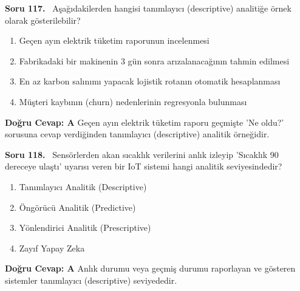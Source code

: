 \documentclass[11pt,a4paper,openany]{book}
\begin{document}
\needspace{5cm}
\vspace{8pt}
\noindent\textbf{\large\sffamily Soru 117.} \ Aşağıdakilerden hangisi tanımlayıcı (descriptive) analitiğe örnek olarak gösterilebilir?
\begin{enumerate}[label=\Alph*), leftmargin=25pt, topsep=4pt, itemsep=2pt]
    \item Geçen ayın elektrik tüketim raporunun incelenmesi
    \item Fabrikadaki bir makinenin 3 gün sonra arızalanacağının tahmin edilmesi
    \item En az karbon salınımı yapacak lojistik rotanın otomatik hesaplanması
    \item Müşteri kaybının (churn) nedenlerinin regresyonla bulunması
\end{enumerate}
\vspace{4pt}
\begin{tcolorbox}[title=Cevap ve Açıklama, colback=gray!3!white, colframe=primarycolor!90!black, arc=2mm, fonttitle=\bfseries\sffamily, top=6pt, bottom=6pt]
    \textbf{Doğru Cevap: A}
    \vspace{2pt}
    Geçen ayın elektrik tüketim raporu geçmişte 'Ne oldu?' sorusuna cevap verdiğinden tanımlayıcı (descriptive) analitik örneğidir.
\end{tcolorbox}
\vspace{10pt}

\needspace{5cm}
\vspace{8pt}
\noindent\textbf{\large\sffamily Soru 118.} \ Sensörlerden akan sıcaklık verilerini anlık izleyip 'Sıcaklık 90 dereceye ulaştı' uyarısı veren bir IoT sistemi hangi analitik seviyesindedir?
\begin{enumerate}[label=\Alph*), leftmargin=25pt, topsep=4pt, itemsep=2pt]
    \item Tanımlayıcı Analitik (Descriptive)
    \item Öngörücü Analitik (Predictive)
    \item Yönlendirici Analitik (Prescriptive)
    \item Zayıf Yapay Zeka
\end{enumerate}
\vspace{4pt}
\begin{tcolorbox}[title=Cevap ve Açıklama, colback=gray!3!white, colframe=primarycolor!90!black, arc=2mm, fonttitle=\bfseries\sffamily, top=6pt, bottom=6pt]
    \textbf{Doğru Cevap: A}
    \vspace{2pt}
    Anlık durumu veya geçmiş durumu raporlayan ve gösteren sistemler tanımlayıcı (descriptive) seviyededir.
\end{tcolorbox}
\vspace{10pt}
\end{document}
